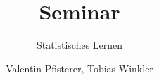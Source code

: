 \documentclass[%
	,ngerman					%
	,fontsize	= 12pt		%
	,parskip	= half-		%
	,BCOR		= 0mm		%
	,leqno					%
	,abstract	= false		%
	,headings	= small		%
	,DIV		= calc		%
	]{scrartcl}   			%
\newcommand{\authors}{Valentin Pfisterer, Tobias Winkler}
\newcommand{\numbering}{Seminar}
\begin{document}
\pagestyle{headings}
\title{\numbering}
\subtitle{Statistisches Lernen}
\author{\authors{}}
\date{} %







\end{document}
